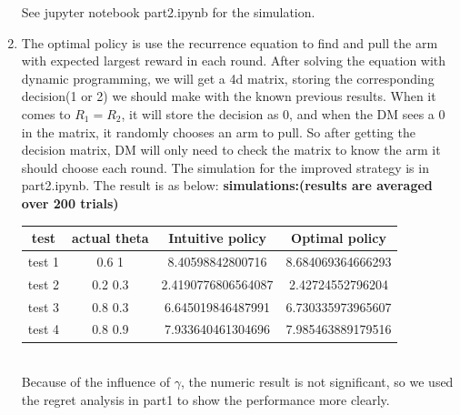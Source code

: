 \documentclass{article}
\begin{document}
\begin{homeworkProblem}
\begin{enumerate}[1.]
        See jupyter notebook part2.ipynb for the simulation.
        \item
        The optimal policy is use the recurrence equation to find and pull the arm with expected largest reward in each round. After solving the equation with dynamic programming, we will get a 4d matrix, storing the corresponding decision(1 or 2) we should make with the known previous results. When it comes to $R_1=R_2$, it will store the decision as 0, and when the DM sees a 0 in the matrix, it randomly chooses an arm to pull.
        So after getting the decision matrix, DM will only need to check the matrix to know the arm it should choose each round. The simulation for the improved strategy is in part2.ipynb.
        The result is as below:
        \textbf{simulations:(results are averaged over 200 trials)}\\
        \begin{tabular}[t]{|c|c|c|c|}
        \hline
        test & actual theta & Intuitive policy & Optimal policy \\
        \hline
        test 1 & 0.6 1 & 8.40598842800716 & 8.684069364666293 \\
        \hline
        test 2 & 0.2 0.3 & 2.4190776806564087 & 2.42724552796204 \\
        \hline
        test 3 & 0.8 0.3 & 6.645019846487991 & 6.730335973965607 \\
        \hline
        test 4 & 0.8 0.9 & 7.933640461304696 & 7.985463889179516 \\
        \hline
        \end{tabular}\\
        Because of the influence of $\gamma$, the numeric result is not significant, so we used the regret analysis in part1 to show the performance more clearly.\\
        \pagebreak
        

\end{enumerate}
\end{homeworkProblem}
\end{document}
